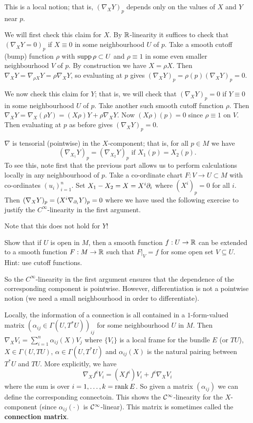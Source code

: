 \begin{rmk}
  \lv
  \begin{enum}
    \io
    This is a local notion; that is, $(\nabla_XY)_p$ depends only on the values of $X$ and $Y$ near $p$.

    We will first check this claim for $X$.
    By $\mathbb{R}$-linearity it suffices to check that $(\nabla_XY=0)_p$ if $X\equiv0$ in some neighbourhood $U$ of $p$.
    Take a smooth cutoff (bump) function $\rho$ with $\operatorname{supp}\rho\subset U$ and $\rho\equiv1$ in some even smaller neighbourhood $V$ of $p$.
    By construction we have $X=\rho X$.
    Then $\nabla_XY=\nabla_{\rho X}Y=\rho\nabla_XY$, so evaluating at $p$ gives $(\nabla_XY)_p=\rho(p)(\nabla_XY)_p=0$.

    We now check this claim for $Y$; that is, we will check that $(\nabla_XY)_p=0$ if $Y\equiv0$ in some neighbourhood $U$ of $p$.
    Take another such smooth cutoff function $\rho$.
    Then $\nabla_XY=\nabla_X(\rho Y)=(X\rho)Y+\rho\nabla_XY$.
    Now $(X\rho)(p)=0$ since $\rho\equiv1$ on $V$.
    Then evaluating at $p$ as before gives $(\nabla_XY)_p=0$.

    \io
    $\nabla$ is tensorial (pointwise) in the $X$-component; that is, for all $p\in M$ we have
    \[ (\nabla_{X_1}Y)_p=(\nabla_{X_2}Y)_p \text{ if } X_1(p)=X_2(p). \]
    To see this, note first that the previous part allows us to perform calculations locally in any neighbourhood of $p$.
    Take a co-ordinate chart $F: V \to U \subset M$ with co-ordinates $(u_i)_{i=1}^n$.
    Set $X_1-X_2=X=X^i\partial_i$ where $(X^i)_p=0$ for all $i$.
    Then $(\nabla_XY)_p=(X^i\nabla_{\partial_i}Y)_p=0$ where we have used the following exercise to justify the $C^\infty$-linearity in the first argument.

    Note that this does not hold for $Y$!

    \begin{exer}
      Show that if $U$ is open in $M$, then a smooth function $f:U \to \mathbb{R}$ can be extended to a smooth function $F:M \to \mathbb{R}$ such that $F|_V=f$ for some open set $V \subseteq U$.
      Hint: use cutoff functions.
    \end{exer}

    So the $C^\infty$-linearity in the first argument ensures that the dependence of the corresponding component is pointwise.
    However, differentiation is not a pointwise notion (we need a small neighbourhood in order to differentiate).

    \io
    Locally, the information of a connection is all contained in a $1$-form-valued matrix $(\alpha_{ij}\in\Gamma(U,T^*U))_{ij}$ for some neighbourhood $U$ in $M$.
    Then $\nabla_XV_i=\sum_{i=1}^n \alpha_{ij}(X)V_j$ where $\{V_i\}$ is a local frame for the bundle $E$ (or $TU$), $X\in\Gamma(U,TU)$, $\alpha\in\Gamma(U,T^*U)$ and $\alpha_{ij}(X)$ is the natural pairing between $T^*U$ and $TU$.
    More explicitly, we have
    \[ \nabla_X f^iV_i = (Xf^i)V_i+f^i\nabla_XV_i \]
    where the sum is over $i=1,\ldots,k=\operatorname{rank} E$.
    So given a matrix $(\alpha_{ij})$ we can define the corresponding connectoin.
    This shows the $\mathcal{C}^\infty$-linearity for the $X$-component (since $\alpha_{ij}(\cdot)$ is $\mathcal{C}^\infty$-linear).
    This matrix is sometimes called the \textbf{connection matrix}.


\end{enum}
\end{rmk}
